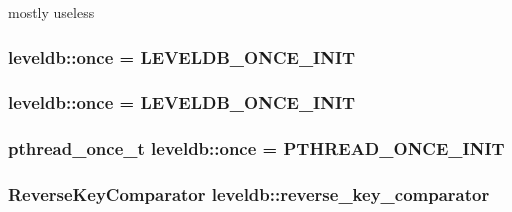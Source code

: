 mostly useless 

\hypertarget{namespaceleveldb_aaca89bbfe8c9115ec6faaf59a77ca965}{}
\subsubsection[{once}]{ leveldb\+::once = {\bf L\+E\+V\+E\+L\+D\+B\+\_\+\+O\+N\+C\+E\+\_\+\+I\+N\+I\+T}\hspace{0.3cm}{\ttfamily [static]}}\label{namespaceleveldb_aaca89bbfe8c9115ec6faaf59a77ca965}
\hypertarget{namespaceleveldb_aaca89bbfe8c9115ec6faaf59a77ca965}{}
\subsubsection[{once}]{ leveldb\+::once = {\bf L\+E\+V\+E\+L\+D\+B\+\_\+\+O\+N\+C\+E\+\_\+\+I\+N\+I\+T}\hspace{0.3cm}{\ttfamily [static]}}\label{namespaceleveldb_aaca89bbfe8c9115ec6faaf59a77ca965}
\hypertarget{namespaceleveldb_ae0ee2b9a8da60ad51918137eba9ffedb}{}
\subsubsection[{once}]{\setlength{\rightskip}{0pt plus 5cm}pthread\+\_\+once\+\_\+t leveldb\+::once = P\+T\+H\+R\+E\+A\+D\+\_\+\+O\+N\+C\+E\+\_\+\+I\+N\+I\+T\hspace{0.3cm}{\ttfamily [static]}}\label{namespaceleveldb_ae0ee2b9a8da60ad51918137eba9ffedb}
\hypertarget{namespaceleveldb_a4f7cb0b6f4da1c10852632bfdb7dd227}{}
\subsubsection[{reverse\+\_\+key\+\_\+comparator}]{\setlength{\rightskip}{0pt plus 5cm}Reverse\+Key\+Comparator leveldb\+::reverse\+\_\+key\+\_\+comparator\hspace{0.3cm}{\ttfamily [static]}}\label{namespaceleveldb_a4f7cb0b6f4da1c10852632bfdb7dd227}
\hypertarget{namespaceleveldb_a0e7f6672e194b1079b807f4fcf034599}{}
